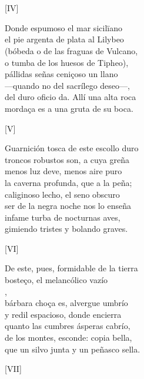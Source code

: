 \documentclass[11pt,a4paper,twoside]{article}
\begin{document}
\section*{\centering \fontsize{11}{14.35}\selectfont[FÁBVLA]}
\vspace{-1em}
\begin{center}
	[IV]
\end{center}
\pstart
Donde espumoso el mar sicilïano\\
el pie argenta de plata al Lilybeo\\
(bóbeda o de las fraguas de Vulcano,\\
o tumba de los huesos de Tipheo),\\
pállidas señas ceniçoso un llano\\
—quando no del sacrílego deseo—,\\
del duro oficio da. Allí una alta roca\\
mordaça es a una gruta de su boca.\pend
\begin{center}
	[V]
\end{center}
\pstart
Guarnición tosca de este escollo duro\\
troncos robustos son, a cuya greña\\
menos luz deve, menos aire puro\\
la caverna profunda, que a la peña;\\
caliginoso lecho, el seno obscuro\\
ser de la negra noche nos lo enseña\\
infame turba de nocturnas aves,\\
gimiendo tristes y bolando graves.\pend
\begin{center}
	[VI]
\end{center}\pstart
De este, pues, formidable de la tierra\\
bosteço, el melancólico vazío\\
,\\
bárbara choça es, alvergue umbrío\\
y redil espacioso, donde encierra\\
quanto las cumbres ásperas cabrío,\\
de los montes, esconde: copia bella,\\
que un silvo junta y un peñasco sella.\pend
\begin{center}
	[VII]
\end{center}\pstart
\end{document}
